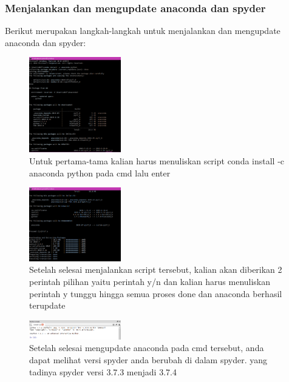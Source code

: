 \subsubsection{Menjalankan dan mengupdate anaconda dan spyder}
Berikut merupakan langkah-langkah untuk menjalankan dan mengupdate anaconda dan spyder:
\begin{figure}[H]
		\includegraphics[width=4cm]{figures/1184065/UpdateAnacondaNew1.PNG}
		\centering
		\caption{Untuk pertama-tama kalian harus menuliskan script conda install -c anaconda python pada cmd lalu enter}
	\end{figure}
	\begin{figure}[H]
		\includegraphics[width=4cm]{figures/1184065/UpdateAnacondaNew2.PNG}
		\centering
		\caption{Setelah selesai menjalankan script tersebut, kalian akan diberikan 2 perintah pilihan yaitu perintah y/n dan kalian harus menuliskan perintah y tunggu hingga semua proses done dan anaconda berhasil terupdate}
	\end{figure}
	\begin{figure}[H]
		\includegraphics[width=4cm]{figures/1184065/UpdateSpyder.PNG}
		\centering
		\caption{Setelah selesai mengupdate anaconda pada cmd tersebut, anda dapat melihat versi spyder anda berubah di dalam spyder. yang tadinya spyder versi 3.7.3 menjadi 3.7.4}
	\end{figure}
	
